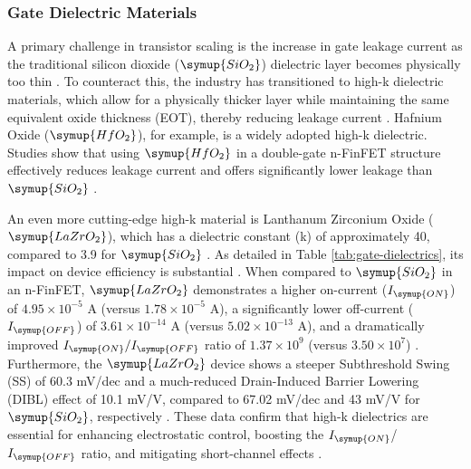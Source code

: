 	\subsubsection{Gate Dielectric Materials}
	A primary challenge in transistor scaling is the increase in gate leakage current as the traditional silicon dioxide ($\symup{SiO_2}$) dielectric layer becomes physically too thin \cite{FinFET1}. To counteract this, the industry has transitioned to high-k dielectric materials, which allow for a physically thicker layer while maintaining the same equivalent oxide thickness (EOT), thereby reducing leakage current \cite{FinFET1}. Hafnium Oxide ($\symup{HfO_2}$), for example, is a widely adopted high-k dielectric. Studies show that using $\symup{HfO_2}$ in a double-gate n-FinFET structure effectively reduces leakage current and offers significantly lower leakage than $\symup{SiO_2}$ \cite{FinFET1}.\par

	An even more cutting-edge high-k material is Lanthanum Zirconium Oxide ($\symup{LaZrO_2}$), which has a dielectric constant (k) of approximately 40, compared to 3.9 for $\symup{SiO_2}$ \cite{FinFET1}. As detailed in Table \ref{tab:gate-dielectrics}, its impact on device efficiency is substantial \cite{FinFET1}. When compared to $\symup{SiO_2}$ in an n-FinFET, $\symup{LaZrO_2}$ demonstrates a higher on-current ($I_{\symup{ON}}$) of $4.95 \times 10^{-5}$ A (versus $1.78 \times 10^{-5}$ A), a significantly lower off-current ($I_{\symup{OFF}}$) of $3.61 \times 10^{-14}$ A (versus $5.02 \times 10^{-13}$ A), and a dramatically improved $I_{\symup{ON}}/I_{\symup{OFF}}$ ratio of $1.37 \times 10^{9}$ (versus $3.50 \times 10^{7}$) \cite{FinFET1}. Furthermore, the $\symup{LaZrO_2}$ device shows a steeper Subthreshold Swing (SS) of 60.3 mV/dec and a much-reduced Drain-Induced Barrier Lowering (DIBL) effect of 10.1 mV/V, compared to 67.02 mV/dec and 43 mV/V for $\symup{SiO_2}$, respectively \cite{FinFET1}. These data confirm that high-k dielectrics are essential for enhancing electrostatic control, boosting the $I_{\symup{ON}}$/$I_{\symup{OFF}}$ ratio, and mitigating short-channel effects \cite{FinFET1}.\par

